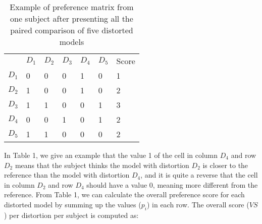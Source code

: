 \begin{table}[]
\centering
\caption{Example of preference matrix from one subject after presenting all the paired comparison of five distorted models}
\label{my-label}
\begin{tabular}{lllllll}
            & $D_1$ & $D_2$ & $D_3$ & $D_4$ & $D_5$ & Score \\
$D_1$ & 0           & 0           & 0           & 1           & 0           & 1     \\
$D_2$ & 1           & 0           & 0           & 1           & 0           & 2     \\
$D_3$ & 1           & 1           & 0           & 0           & 1           & 3     \\
$D_4$ & 0           & 0           & 1           & 0           & 1           & 2     \\
$D_5$ & 1           & 1           & 0           & 0           & 0           & 2    
\end{tabular}
\end{table}
In Table 1, we give an example that the value 1 of the cell in column $D_4$ and row $D_2$ means that the subject thinks the model with distortion $D_2$ is closer to the reference than the model with distortion $D_4$, and it is quite a reverse that the cell in column $D_2$ and row $D_4$ should have a value 0, meaning more different from the reference. From Table 1, we can calculate the overall preference score for each distorted model by summing up the values ($p_i$) in each row. The overall score ($VS$) per distortion per subject is computed as: